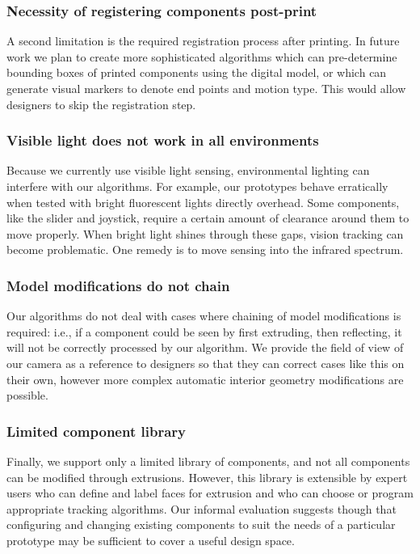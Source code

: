     \subsubsection{Necessity of registering components post-print}
    A second limitation is the required registration process after printing. In future work we plan to create more sophisticated algorithms which can pre-determine bounding boxes of printed components using the digital model, or which can generate visual markers to denote end points and motion type. This would allow designers to skip the registration step.
    
    \subsubsection{Visible light does not work in all environments}
    Because we currently use visible light sensing, environmental lighting can interfere with our algorithms. For example, our prototypes behave erratically when tested with bright fluorescent lights directly overhead. Some components, like the slider and joystick, require a certain amount of clearance around them to move properly. When bright light shines through these gaps, vision tracking can become problematic. One remedy is to move sensing into the infrared spectrum.%
    
    \subsubsection{Model modifications do not chain}
    Our algorithms do not deal with cases where chaining of model modifications is required: i.e., if a component could be seen by first extruding, then reflecting, it will not be correctly processed by our algorithm. We provide the field of view of our camera as a reference to designers so that they can correct cases like this on their own, however more complex automatic interior geometry modifications are possible. 
    
    \subsubsection{Limited component library}
    Finally, we support only a limited library of components, and not all components can be modified through extrusions. However, this library is extensible by expert users who can define and label faces for extrusion and who can choose or program appropriate tracking algorithms. Our informal evaluation suggests though that configuring and changing existing components to suit the needs of a particular prototype may be sufficient to cover a useful design space.
